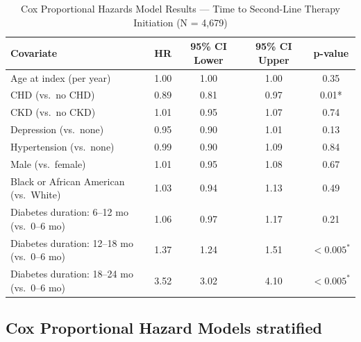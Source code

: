 \documentclass[twoside,11pt]{article}
\begin{document}
\begin{table}[h]
  \centering
  \begin{tabular}{lcccc}
    \hline
    \textbf{Covariate}                          & \textbf{HR} & \textbf{95\% CI Lower} & \textbf{95\% CI Upper} & \textbf{p-value}                   \\
    \hline
    Age at index (per year)                     & 1.00        & 1.00                   & 1.00                   & 0.35                               \\
    CHD (vs.\ no CHD)                           & 0.89        & 0.81                   & 0.97                   & \cellcolor{lightgreen}0.01*        \\
    CKD (vs.\ no CKD)                           & 1.01        & 0.95                   & 1.07                   & 0.74                               \\
    Depression (vs.\ none)                      & 0.95        & 0.90                   & 1.01                   & 0.13                               \\
    Hypertension (vs.\ none)                    & 0.99        & 0.90                   & 1.09                   & 0.84                               \\
    Male (vs.\ female)                          & 1.01        & 0.95                   & 1.08                   & 0.67                               \\
    Black or African American (vs.\ White)      & 1.03        & 0.94                   & 1.13                   & 0.49                               \\
    Diabetes duration: 6--12 mo (vs.\ 0--6 mo)  & 1.06        & 0.97                   & 1.17                   & 0.21                               \\
    Diabetes duration: 12--18 mo (vs.\ 0--6 mo) & 1.37        & 1.24                   & 1.51                   & \cellcolor{lightgreen}$<0.005^{*}$ \\
    Diabetes duration: 18--24 mo (vs.\ 0--6 mo) & 3.52        & 3.02                   & 4.10                   & \cellcolor{lightgreen}$<0.005^{*}$ \\
    \hline
  \end{tabular}
  \caption{Cox Proportional Hazards Model Results --- Time to Second-Line Therapy Initiation (N = 4{,}679)}
  \label{tab:cox_results}
\end{table}

\subsection*{Cox Proportional Hazard Models stratified}
\end{document}
